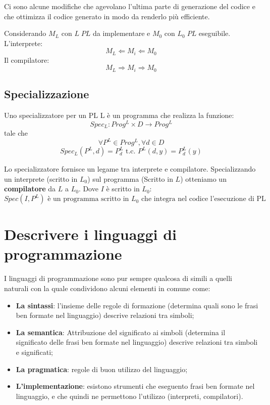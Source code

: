 \documentclass[a4paper]{article}
\begin{document}
Ci sono alcune modifiche che agevolano l'ultima parte di generazione del codice 
e che ottimizza il codice generato in modo da renderlo più efficiente. 
\begin{Example}{}{}
Considerando $M_L$ con $L \; PL$ da implementare e $M_0$ con $L_0 \; PL$ eseguibile. \\
L'interprete:
\[M_L \Longleftarrow M_i \Longleftarrow M_0\]
Il compilatore:
\[M_L \Longrightarrow M_i \Longrightarrow M_0\]
\end{Example}

\subsection{Specializzazione}

{
Uno specializzatore per un PL L è un programma che realizza la funzione:
\[
    Spec_L : Prog^L \times D \to Prog^L
\]
tale che 
\[
    \forall P^L \in Prog^L, \forall d \in D\] \[Spec_L(P^L, d) = P^L_d \text{ t.c. } P^L(d, y) = P^L_d(y)
\]
}

\begin{Observation}{}{}
Lo specializzatore fornisce un legame tra interprete e compilatore. 
Specializzando un interprete (scritto in $L_0$) sul programma (Scritto in $L$) 
otteniamo un \textbf{compilatore} da $L$ a $L_0$. Dove $I$ è scritto in $L_0$: 
\[
    Spec(I, P^L) \text{ è un programma scritto in $L_0$ che integra nel codice l'esecuzione di PL} 
\]
\end{Observation}

\section{Descrivere i linguaggi di programmazione}

I linguaggi di programmazione sono pur sempre qualcosa di simili a quelli naturali
con la quale condividono alcuni elementi in comune come:
\begin{itemize}
    \item \textbf{La sintassi}: l'insieme delle regole di formazione (determina 
    quali sono le frasi ben formate nel linguaggio) descrive relazioni tra simboli;
    \item \textbf{La semantica}: Attribuzione del significato ai simboli (determina 
    il significato delle frasi ben formate nel linguaggio) descrive relazioni tra simboli
    e significati;
    \item \textbf{La pragmatica}: regole di buon utilizzo del linguaggio;
    \item \textbf{L'implementazione}: esistono strumenti che eseguento frasi 
    ben formate nel linguaggio, e che quindi ne permettono l'utilizzo (interpreti, compilatori). 
\end{itemize}
\end{document}
